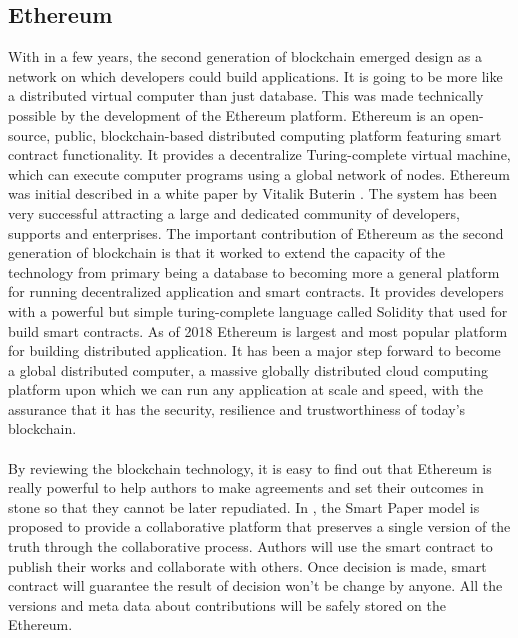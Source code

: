 \documentclass{ecsthesis}      %
\begin{document}
\subsection{Ethereum}
With in a few years,
the second generation of blockchain emerged design as a network on which developers could build applications. 
It is going to be more like a distributed virtual computer than just database.
This was made technically possible by the development of the Ethereum platform. 
Ethereum is an open-source, public, blockchain-based distributed computing platform featuring smart contract functionality.
It provides a decentralize Turing-complete virtual machine, which can execute computer programs using a global network of nodes.
Ethereum was initial described in a white paper by Vitalik Buterin \cite{buterin2013ethereum}. 
The system has been very successful attracting a large and dedicated community of developers, supports and enterprises.
The important contribution of Ethereum as the second generation of blockchain is that 
it worked to extend the capacity of the technology from primary
being a database to becoming more a general platform for running decentralized application and smart contracts.
It provides developers with a powerful but simple turing-complete language called Solidity that used for build smart contracts.
As of 2018 Ethereum is largest and most popular platform for building distributed application. 
It has been a major step forward to become a global distributed computer, 
a massive globally distributed cloud computing platform upon which we can run any application at scale and speed,
with the assurance that it has the security, resilience and trustworthiness of today's blockchain.
\paragraph{}
By reviewing the blockchain technology, 
it is easy to find out that Ethereum is really powerful to
help authors to make agreements and set their outcomes in stone so that they cannot be later repudiated.
In \cite{Khoe:1994:CML:2288694.2294265}, 
the Smart Paper model is proposed to provide a collaborative platform 
that preserves a single version of the truth through the collaborative process. 
Authors will use the smart contract to publish their works and collaborate with others.
Once decision is made, smart contract will guarantee the result of decision won't be change by anyone.
All the versions and meta data about contributions will be safely stored on the Ethereum.
\end{document}
